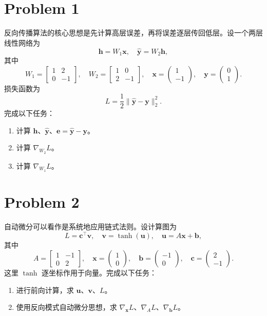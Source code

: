 \section*{Problem 1}

反向传播算法的核心思想是先计算高层误差，再将误差逐层传回低层。设一个两层线性网络为
\[
\bm{h} = W_1 \bm{x},\quad \hat{\bm{y}} = W_2 \bm{h},
\]
其中
\[
W_1 = \begin{bmatrix}
    1 & 2 \\
    0 & -1
\end{bmatrix},\quad
W_2 = \begin{bmatrix}
    1 & 0 \\
    2 & -1
\end{bmatrix},\quad
\bm{x} = \begin{pmatrix} 1 \\ -1 \end{pmatrix},\quad
\bm{y} = \begin{pmatrix} 0 \\ 1 \end{pmatrix}.
\]
损失函数为
\[
L = \frac{1}{2} \|\hat{\bm{y}} - \bm{y}\|_2^2.
\]
完成以下任务：
\begin{enumerate}
    \item 计算 $\bm{h}$、$\hat{\bm{y}}$、$\bm{e} = \hat{\bm{y}} - \bm{y}$。
    \item 计算 $\nabla_{W_2} L$。
    \item 计算 $\nabla_{W_1} L$。
\end{enumerate}

\section*{Problem 2}

自动微分可以看作是系统地应用链式法则。设计算图为
\[
L = \bm{c}^\top \bm{v},\quad
\bm{v} = \tanh(\bm{u}),\quad
\bm{u} = A \bm{x} + \bm{b},
\]
其中
\[
A = \begin{bmatrix}
    1 & -1 \\
    0 & 2
\end{bmatrix},\quad
\bm{x} = \begin{pmatrix} 1 \\ 0 \end{pmatrix},\quad
\bm{b} = \begin{pmatrix} -1 \\ 0 \end{pmatrix},\quad
\bm{c} = \begin{pmatrix} 2 \\ -1 \end{pmatrix}.
\]
这里 $\tanh$ 逐坐标作用于向量。完成以下任务：
\begin{enumerate}
    \item 进行前向计算，求 $\bm{u}$、$\bm{v}$、$L$。
    \item 使用反向模式自动微分思想，求 $\nabla_{\bm{x}} L$、$\nabla_{A} L$、$\nabla_{\bm{b}} L$。
\end{enumerate}

